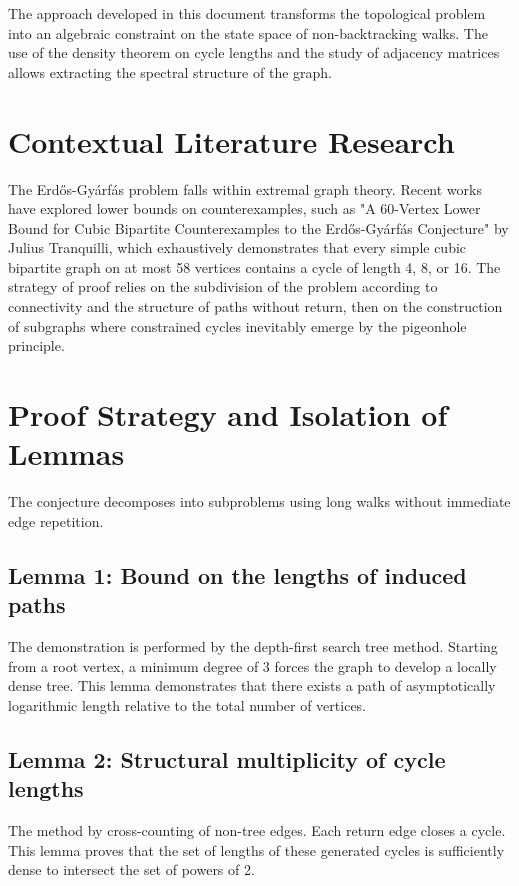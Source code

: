 \documentclass[12pt,a4paper]{article}
\begin{document}
The approach developed in this document transforms the topological problem into an algebraic constraint on the state space of non-backtracking walks. The use of the density theorem on cycle lengths and the study of adjacency matrices allows extracting the spectral structure of the graph.

\section{Contextual Literature Research}

The Erd\H{o}s-Gy\'arf\'as problem falls within extremal graph theory. Recent works have explored lower bounds on counterexamples, such as "A 60-Vertex Lower Bound for Cubic Bipartite Counterexamples to the Erd\H{o}s-Gy\'arf\'as Conjecture" by Julius Tranquilli, which exhaustively demonstrates that every simple cubic bipartite graph on at most 58 vertices contains a cycle of length 4, 8, or 16. The strategy of proof relies on the subdivision of the problem according to connectivity and the structure of paths without return, then on the construction of subgraphs where constrained cycles inevitably emerge by the pigeonhole principle.

\section{Proof Strategy and Isolation of Lemmas}

The conjecture decomposes into subproblems using long walks without immediate edge repetition.

\subsection{Lemma 1: Bound on the lengths of induced paths}
The demonstration is performed by the depth-first search tree method. Starting from a root vertex, a minimum degree of 3 forces the graph to develop a locally dense tree. This lemma demonstrates that there exists a path of asymptotically logarithmic length relative to the total number of vertices.

\subsection{Lemma 2: Structural multiplicity of cycle lengths}
The method by cross-counting of non-tree edges. Each return edge closes a cycle. This lemma proves that the set of lengths of these generated cycles is sufficiently dense to intersect the set of powers of 2.
\end{document}
